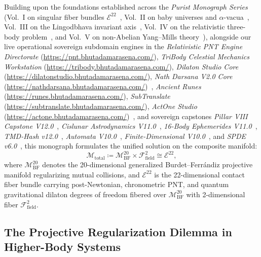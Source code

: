 \documentclass[11pt,a4paper,reqno]{article}
\theoremstyle{plain}
\theoremstyle{definition}
\theoremstyle{remark}
\numberwithin{equation}{section}
\newcommand{\MbfTwenty}{\mathcal{M}_{\mathrm{BF}}^{20}}
\newcommand{\Ebundle}{\mathcal{E}^{22}}
\begin{document}
Building upon the foundations established across the \emph{Purist Monograph Series} (Vol.~I on singular fiber bundles $\Ebundle$~\cite{PuristVol1Monograph2026}, Vol.~II on baby universes and $\alpha$-vacua~\cite{PuristVol2Monograph2026}, Vol.~III on the Lingodbhava invariant axis~\cite{PuristVol3Monograph2026}, Vol.~IV on the relativistic three-body problem~\cite{RelativisticThreeBody2026}, and Vol.~V on non-Abelian Yang--Mills theory~\cite{PuristYangMillsVol5Monograph2026}), alongside our live operational sovereign subdomain engines in the \emph{Relativistic PNT Engine Directorate} (\url{https://pnt.bhutadamarasena.com/}), \emph{TriBody Celestial Mechanics Workstation} (\url{https://tribody.bhutadamarasena.com/}), \emph{Dilaton Studio Core} (\url{https://dilatonstudio.bhutadamarasena.com/}), \emph{Nath Darsana V2.0 Core} (\url{https://nathdarsana.bhutadamarasena.com/})~\cite{NathDarsanaV2Monograph2026}, \emph{Ancient Runes} (\url{https://runes.bhutadamarasena.com/}), \emph{SubTranslate} (\url{https://subtranslate.bhutadamarasena.com/}), \emph{ActOne Studio} (\url{https://actone.bhutadamarasena.com/})~\cite{ActOneStudioMonograph2026}, and sovereign capstones \emph{Pillar VIII Capstone V12.0}~\cite{NonagonCapstoneV12Monograph2026}, \emph{Cislunar Astrodynamics V11.0}~\cite{CislunarV11Monograph2026}, \emph{16-Body Ephemerides V11.0}~\cite{SixteenBodyV11Monograph2026}, \emph{TMD-Hash v12.0}~\cite{TMDHashV12Monograph2026}, \emph{Automata V10.0}~\cite{AutomataV10Monograph2026}, \emph{Finite-Dimensional V10.0}~\cite{FiniteV10Monograph2026}, and \emph{SPDE v6.0}~\cite{SPDEV60}, this monograph formulates the unified solution on the composite manifold:
\begin{equation}
  \mathcal{M}_{\mathrm{total}} \coloneqq \MbfTwenty \times \mathcal{F}_{\mathrm{field}}^2 \cong \Ebundle,
  \label{eq:manifold_total_def}
\end{equation}
where $\MbfTwenty$ denotes the 20-dimensional generalized Burdet--Ferr\'{a}ndiz projective manifold regularizing mutual collisions, and $\Ebundle$ is the 22-dimensional contact fiber bundle carrying post-Newtonian, chronometric PNT, and quantum gravitational dilaton degrees of freedom fibered over $\MbfTwenty$ with 2-dimensional fiber $\mathcal{F}_{\mathrm{field}}^2$.

\subsection{The Projective Regularization Dilemma in Higher-Body Systems}
\label{subsec:projective_dilemma}
\end{document}
